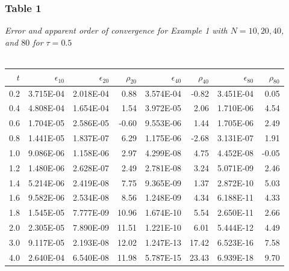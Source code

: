 \documentclass[letterpaper, 12pt]{article}
\begin{document}
	\subsubsection*{Table 1} \small\textit{Error and apparent order of convergence for Example 1 with $N=10,20,40$,\\ and $80$ for $\tau=0.5$} \\\\
	\normalsize
	\begin{tabular}{r||rrrrrrr}
		\hline
		$t$  &$\epsilon_{10}$  &$\epsilon_{20}$  &$\rho_{20}$  &$\epsilon_{40}$  &$\rho_{40}$  &$\epsilon_{80}$  &$\rho_{80}$ \\ 
		\hline
		0.2    &3.715E-04    &2.018E-04         &0.88    &3.574E-04        &-0.82    &3.451E-04         &0.05 \\ 
		0.4    &4.808E-04    &1.654E-04         &1.54    &3.972E-05         &2.06    &1.710E-06         &4.54 \\ 
		0.6    &1.704E-05    &2.586E-05        &-0.60    &9.553E-06         &1.44    &1.705E-06         &2.49 \\ 
		0.8    &1.441E-05    &1.837E-07         &6.29    &1.175E-06        &-2.68    &3.131E-07         &1.91 \\ 
		1.0    &9.086E-06    &1.158E-06         &2.97    &4.299E-08         &4.75    &4.452E-08        &-0.05 \\ 
		1.2    &1.480E-06    &2.628E-07         &2.49    &2.781E-08         &3.24    &5.071E-09         &2.46 \\ 
		1.4    &5.214E-06    &2.419E-08         &7.75    &9.365E-09         &1.37    &2.872E-10         &5.03 \\ 
		1.6    &9.582E-06    &2.534E-08         &8.56    &1.248E-09         &4.34    &6.188E-11         &4.33 \\ 
		1.8    &1.545E-05    &7.777E-09        &10.96    &1.674E-10         &5.54    &2.650E-11         &2.66 \\ 
		2.0    &2.305E-05    &7.890E-09        &11.51    &1.221E-10         &6.01    &5.444E-12         &4.49 \\ 
		3.0    &9.117E-05    &2.193E-08        &12.02    &1.247E-13        &17.42    &6.523E-16         &7.58 \\ 
		4.0    &2.640E-04    &6.540E-08        &11.98    &5.787E-15        &23.43    &6.939E-18         &9.70 \\ 
		\hline
	\end{tabular}
	
\end{document}
